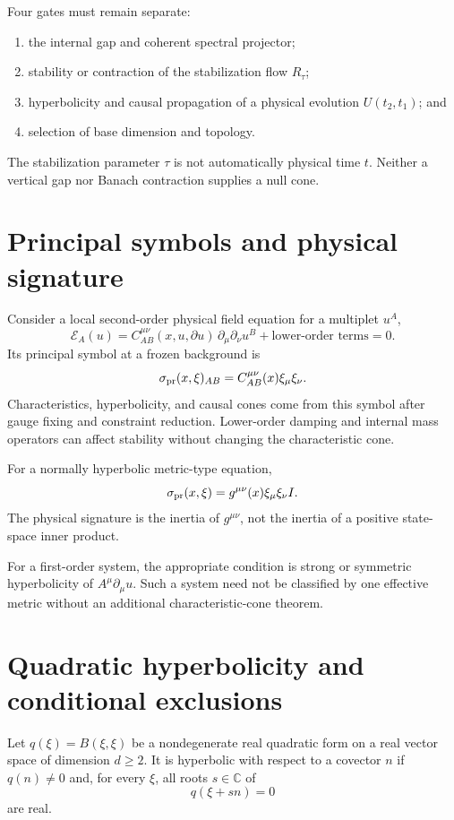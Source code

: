 \documentclass[11pt]{article}
\begin{document}
Four gates must remain separate:
\begin{enumerate}
\item the internal gap and coherent spectral projector;
\item stability or contraction of the stabilization flow $R_\tau$;
\item hyperbolicity and causal propagation of a physical evolution $U(t_2,t_1)$;
and
\item selection of base dimension and topology.
\end{enumerate}
The stabilization parameter $\tau$ is not automatically physical time $t$.
Neither a vertical gap nor Banach contraction supplies a null cone.

\section{Principal symbols and physical signature}

Consider a local second-order physical field equation for a multiplet $u^A$,
\[
 \mathcal E_A(u)
 =C_{AB}^{\mu\nu}(x,u,\partial u)\,\partial_\mu\partial_\nu u^B
 +\text{lower-order terms}=0.
\]
Its principal symbol at a frozen background is
\[
 \sigma_{\rm pr}(x,\xi)_{AB}
 =C_{AB}^{\mu\nu}(x)\xi_\mu\xi_\nu.
\]
Characteristics, hyperbolicity, and causal cones come from this symbol after
gauge fixing and constraint reduction. Lower-order damping and internal mass
operators can affect stability without changing the characteristic cone.

For a normally hyperbolic metric-type equation,
\[
 \sigma_{\rm pr}(x,\xi)
 =g^{\mu\nu}(x)\xi_\mu\xi_\nu I.
\]
The physical signature is the inertia of $g^{\mu\nu}$, not the inertia of a
positive state-space inner product.

For a first-order system, the appropriate condition is strong or symmetric
hyperbolicity of $A^\mu\partial_\mu u$. Such a system need not be classified by
one effective metric without an additional characteristic-cone theorem.

\section{Quadratic hyperbolicity and conditional exclusions}

Let $q(\xi)=B(\xi,\xi)$ be a nondegenerate real quadratic form on a real vector
space of dimension $d\ge2$. It is hyperbolic with respect to a covector $n$ if
$q(n)\ne0$ and, for every $\xi$, all roots $s\in\mathbb C$ of
\[
 q(\xi+s n)=0
\]
are real.
\end{document}
